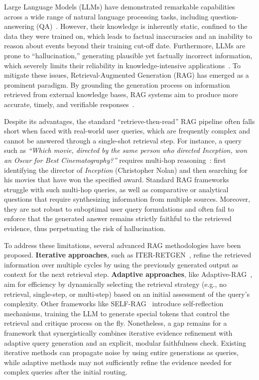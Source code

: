 \documentclass[11pt]{article}
\begin{document}
Large Language Models (LLMs) have demonstrated remarkable capabilities across a wide range of natural language processing tasks, including question-answering (QA)~\cite{brown2020languagemodelsfewshotlearners, chowdhery2022palmscalinglanguagemodeling}. However, their knowledge is inherently static, confined to the data they were trained on, which leads to factual inaccuracies and an inability to reason about events beyond their training cut-off date. Furthermore, LLMs are prone to ``hallucination,'' generating plausible yet factually incorrect information, which severely limits their reliability in knowledge-intensive applications~\cite{ji2023survey}. To mitigate these issues, Retrieval-Augmented Generation (RAG) has emerged as a prominent paradigm. By grounding the generation process on information retrieved from external knowledge bases, RAG systems aim to produce more accurate, timely, and verifiable responses~\cite{lewis2020retrieval}.

Despite its advantages, the standard ``retrieve-then-read'' RAG pipeline often falls short when faced with real-world user queries, which are frequently complex and cannot be answered through a single-shot retrieval step. For instance, a query such as \emph{``Which movie, directed by the same person who directed Inception, won an Oscar for Best Cinematography?''} requires multi-hop reasoning~\cite{yang2018hotpotqa}: first identifying the director of \emph{Inception} (Christopher Nolan) and then searching for his movies that have won the specified award. Standard RAG frameworks struggle with such multi-hop queries, as well as comparative or analytical questions that require synthesizing information from multiple sources. Moreover, they are not robust to suboptimal user query formulations and often fail to enforce that the generated answer remains strictly faithful to the retrieved evidence, thus perpetuating the risk of hallucination.

To address these limitations, several advanced RAG methodologies have been proposed. \textbf{Iterative approaches}, such as ITER-RETGEN~\cite{shao2023iter}, refine the retrieved information over multiple cycles by using the previously generated output as context for the next retrieval step. \textbf{Adaptive approaches}, like Adaptive-RAG~\cite{jeong2024adaptiveraglearningadaptretrievalaugmented}, aim for efficiency by dynamically selecting the retrieval strategy (e.g., no retrieval, single-step, or multi-step) based on an initial assessment of the query's complexity. Other frameworks like SELF-RAG~\cite{asai2023self} introduce self-reflection mechanisms, training the LLM to generate special tokens that control the retrieval and critique process on the fly. Nonetheless, a gap remains for a framework that synergistically combines iterative evidence refinement with adaptive query generation and an explicit, modular faithfulness check. Existing iterative methods can propagate noise by using entire generations as queries, while adaptive methods may not sufficiently refine the evidence needed for complex queries after the initial routing.
\end{document}
